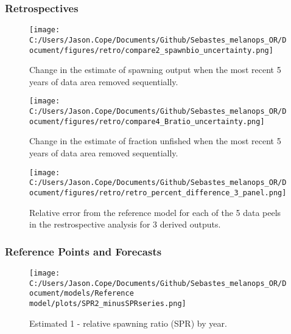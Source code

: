 \documentclass[11pt,
  letterpaper,
]{article}
\begin{document}
\newpage

\hypertarget{retrospectives}{%
\subsubsection{Retrospectives}\label{retrospectives}}

\begin{figure}
{\centering
\texttt{[image: C:/Users/Jason.Cope/Documents/Github/Sebastes\_melanops\_OR/Document/figures/retro/compare2\_spawnbio\_uncertainty.png]}
}
\caption{Change in the estimate of spawning output when the most recent 5 years of data area removed sequentially.\label{fig:retro-ssb}}
\end{figure}

\newpage

\begin{figure}
{\centering
\texttt{[image: C:/Users/Jason.Cope/Documents/Github/Sebastes\_melanops\_OR/Document/figures/retro/compare4\_Bratio\_uncertainty.png]}
}
\caption{Change in the estimate of fraction unfished when the most recent 5 years of data area removed sequentially.\label{fig:retro-depl}}
\end{figure}

\newpage

\begin{figure}
{\centering
\texttt{[image: C:/Users/Jason.Cope/Documents/Github/Sebastes\_melanops\_OR/Document/figures/retro/retro\_percent\_difference\_3\_panel.png]}
}
\caption{Relative error from the reference model for each of the 5 data peels in the restrospective analysis for 3 derived outputs.\label{fig:retro-RE_comps}}
\end{figure}

\newpage

\hypertarget{reference-points-and-forecasts}{%
\subsubsection{Reference Points and Forecasts}\label{reference-points-and-forecasts}}

\begin{figure}
{\centering
\texttt{[image: C:/Users/Jason.Cope/Documents/Github/Sebastes\_melanops\_OR/Document/models/Reference model/plots/SPR2\_minusSPRseries.png]}
}
\caption{Estimated 1 - relative spawning ratio (SPR) by year.\label{fig:1-spr}}
\end{figure}
\end{document}
